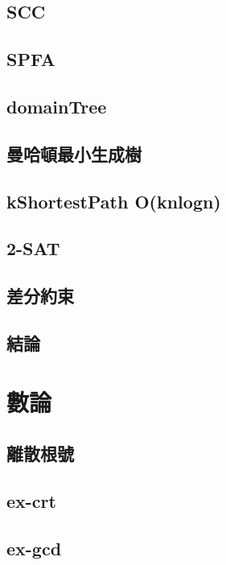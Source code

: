 \documentclass[a4paper,10pt,twocolumn,oneside]{article}
\begin{document}
\subsection{SCC}

\subsection{SPFA}

\subsection{domainTree} 

\subsection{曼哈頓最小生成樹}

\subsection{kShortestPath O(knlogn)}

\subsection{2-SAT}

\subsection{差分約束}

\subsection{結論}

\section{數論}
\subsection{離散根號}

\subsection{ex-crt}

\subsection{ex-gcd}

\end{document}

